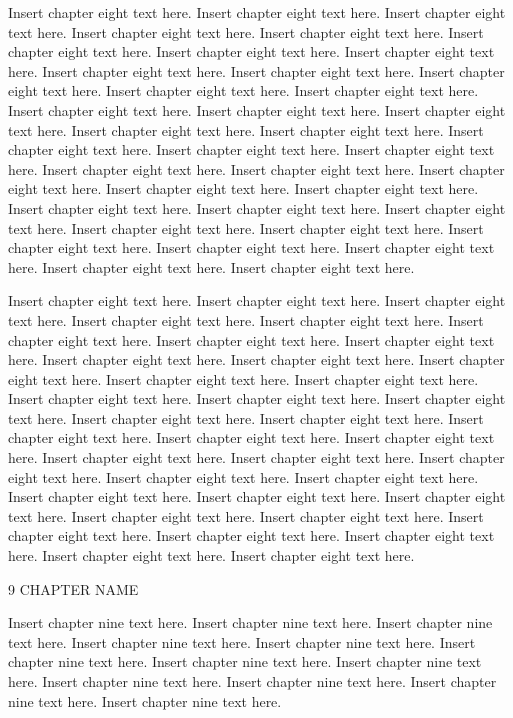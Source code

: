 Insert chapter eight text here. Insert chapter eight text here. Insert chapter eight text here. Insert chapter eight text here. Insert chapter eight text here. Insert chapter eight text here. Insert chapter eight text here. Insert chapter eight text here. Insert chapter eight text here. Insert chapter eight text here. Insert chapter eight text here. Insert chapter eight text here. Insert chapter eight text here. Insert chapter eight text here. Insert chapter eight text here. Insert chapter eight text here. Insert chapter eight text here. Insert chapter eight text here. Insert chapter eight text here. Insert chapter eight text here. Insert chapter eight text here. Insert chapter eight text here. Insert chapter eight text here. Insert chapter eight text here. Insert chapter eight text here. Insert chapter eight text here. Insert chapter eight text here. Insert chapter eight text here. Insert chapter eight text here. Insert chapter eight text here. Insert chapter eight text here. Insert chapter eight text here. Insert chapter eight text here. Insert chapter eight text here. Insert chapter eight text here. Insert chapter eight text here.

Insert chapter eight text here. Insert chapter eight text here. Insert chapter eight text here. Insert chapter eight text here. Insert chapter eight text here. Insert chapter eight text here. Insert chapter eight text here. Insert chapter eight text here. Insert chapter eight text here. Insert chapter eight text here. Insert chapter eight text here. Insert chapter eight text here. Insert chapter eight text here. Insert chapter eight text here. Insert chapter eight text here. Insert chapter eight text here. Insert chapter eight text here. Insert chapter eight text here. Insert chapter eight text here. Insert chapter eight text here. Insert chapter eight text here. Insert chapter eight text here. Insert chapter eight text here. Insert chapter eight text here. Insert chapter eight text here. Insert chapter eight text here. Insert chapter eight text here. Insert chapter eight text here. Insert chapter eight text here. Insert chapter eight text here. Insert chapter eight text here. Insert chapter eight text here. Insert chapter eight text here. Insert chapter eight text here. Insert chapter eight text here. Insert chapter eight text here.

9 CHAPTER NAME

Insert chapter nine text here. Insert chapter nine text here. Insert chapter nine text here. Insert chapter nine text here. Insert chapter nine text here. Insert chapter nine text here. Insert chapter nine text here. Insert chapter nine text here. Insert chapter nine text here. Insert chapter nine text here. Insert chapter nine text here. Insert chapter nine text here.

